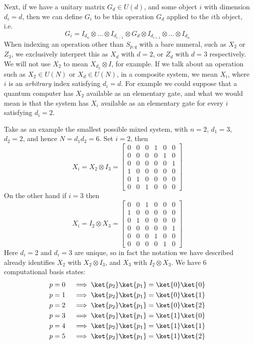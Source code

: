 Next, if we have a unitary matrix $G_{d} \in U(d)$, and some object $i$ with dimension $d_i = d$, then we can define $G_i$ to be this operation $G_d$ applied to the $i$th object, i.e. 
\[G_i = I_{d_n}\otimes \dots \otimes I_{d_{i-1}} \otimes G_d \otimes I_{d_{i+1}} \otimes \dots \otimes I_{d_n}\]
When indexing an operation other than $S_{p,q}$ with a bare numeral, such as $X_2$ or $Z_3$, we exclusively interpret this as $X_d$ with $d = 2$, or $Z_d$ with $d = 3$ respectively. We will not use $X_2$ to mean $X_{d_2} \otimes I$, for example. If we talk about an operation such as  $X_2 \in U(N)$ or $X_d \in U(N)$, in a composite system, we mean $X_i$, where $i$ is an \emph{arbitrary} index satisfying $d_i = d$. For example we could suppose that a quantum computer has $X_2$ available as an elementary gate, and what we would mean is that the system has $X_i$ available as an elementary gate for every $i$ satisfying $d_i = 2$.

Take as an example the smallest possible mixed system, with $n = 2$, $d_1 = 3$, $d_2 = 2$, and hence $N = d_1d_2 = 6$. Set $i = 2$, then
\[X_i = X_2 \otimes I_3 = \begin{bmatrix}
0 & 0 & 0 & 1 & 0 & 0 \\
0 & 0 & 0 & 0 & 1 & 0 \\
0 & 0 & 0 & 0 & 0 & 1 \\
1 & 0 & 0 & 0 & 0 & 0 \\
0 & 1 & 0 & 0 & 0 & 0 \\
0 & 0 & 1 & 0 & 0 & 0
\end{bmatrix}\]
On the other hand if $i = 3$ then
\[X_i = I_2 \otimes X_3 = \begin{bmatrix}
	0 & 0 & 1 & 0 & 0 & 0 \\
	1 & 0 & 0 & 0 & 0 & 0 \\
	0 & 1 & 0 & 0 & 0 & 0 \\
	0 & 0 & 0 & 0 & 0 & 1 \\
	0 & 0 & 0 & 1 & 0 & 0 \\
	0 & 0 & 0 & 0 & 1 & 0
\end{bmatrix}\]
Here $d_i = 2$ and $d_i = 3$ are unique, so in fact the notation we have described already identifies $X_2$ with $X_2 \otimes I_3$, and $X_3$ with $I_2 \otimes X_3$. We have 6 computational basis states:
\begin{align*}
	p = 0 &&& \implies \ket{p_2}\ket{p_1} = \ket{0}\ket{0} \\
	p = 1 &&& \implies \ket{p_2}\ket{p_1} = \ket{0}\ket{1} \\
	p = 2 &&& \implies \ket{p_2}\ket{p_1} = \ket{0}\ket{2} \\
	p = 3 &&& \implies \ket{p_2}\ket{p_1} = \ket{1}\ket{0} \\
	p = 4 &&& \implies \ket{p_2}\ket{p_1} = \ket{1}\ket{1} \\
	p = 5 &&& \implies \ket{p_2}\ket{p_1} = \ket{1}\ket{2} \\
\end{align*}

